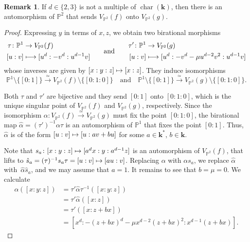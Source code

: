 \documentclass[11pt]{article}
\newcommand\mto{\mathchoice{\longmapsto}{\mapsto}{\mapsto}{\mapsto}}
\newcommand\quand{\quad\text{and}\quad}
\newcommand\qquand{\qquad\text{and}\qquad}
\theoremstyle{definition}
\newtheorem{remark}[lemma]{Remark}
\newcommand\iso{\stackrel{\simeq}{\longrightarrow}}
\renewcommand\k{{\mathbf k}}
\newcommand\p{{\mathbb P}}\let\PP\p
\newcommand{\kk}{\mathbf{k}}
\DeclareMathOperator{\car}{char}
\begin{document}
\begin{remark}
If $d \in \{2, 3\}$ is not a multiple of $\car(\kk)$, then
there is an automorphism of $\PP^2$ that sends $V_{\PP^2}(f)$ onto $V_{\PP^2}(g)$.
\end{remark}

\begin{proof}
Expressing $y$ in terms of $x,z$, we obtain two birational morphisms
\[
\begin{aligned}
\tau\colon \p^1 & \to V_{\p^2}(f)\\
 {[u:v]} & \mto [u^d:-v^d:u^{d-1}v]
\end{aligned}\qquand
\begin{aligned}
\tau'\colon \p^1 & \to V_{\p^2}(g)\\
{[u:v]} & \mto [u^d:-v^d-\mu u^{d-2}v^2:u^{d-1}v]
\end{aligned}
\]
whose inverses are given by $[x:y:z]\mto [x:z]$. They induce isomorphisms
\[
\p^1\setminus \{[0:1]\}\iso V_{\p^2}(f)\setminus \{[0:1:0]\}\quand\p^1\setminus \{[0:1]\}\iso V_{\p^2}(g)\setminus \{[0:1:0]\}.
\]

Both $\tau$ and $\tau'$ are bijective and they send $[0:1]$ onto $[0:1:0]$, which is the unique singular point of $V_{\p^{2}}(f)$ and $V_{\p^{2}}(g)$,
respectively. Since the isomorphism $\alpha\colon V_{\p^{2}}(f)\iso V_{\p^{2}}(g)$ must fix the point $[0:1:0]$, the birational map $\hat\alpha=(\tau')^{-1}\alpha\tau$ is an automorphism of $\p^1$ that fixes the point $[0:1]$. Thus, $\hat\alpha$ is of the form $[u:v]\mto [u:av+bu]$ for some $a\in \k^*$, $b\in \k$.

Note that $s_a\colon [x:y:z]\mto [a^d x:y:a^{d-1} z]$ is an automorphism of $V_{\p^2}(f)$, that lifts to $\hat s_a=(\tau)^{-1}s_a\tau=[u:v]\mto [a u:v]$. Replacing $\alpha$ with $\alpha s_a$, we replace $\hat\alpha$ with~$\hat\alpha \hat s_a$,
and we may assume that $a=1$. It remains to see that $b=\mu=0$.
We calculate
\begin{align*}
\alpha( [x:y:z]) &= \tau' \hat\alpha \tau^{-1}( [x:y:z])\\
&= \tau' \hat\alpha([x:z]) \\
&= \tau' ([x:z+bx]) \\
&= [x^d:-(z+bx)^d-\mu x^{d-2}(z+bx)^2:x^{d-1}(z+bx)].
\end{align*}


\end{proof}
\end{document}

